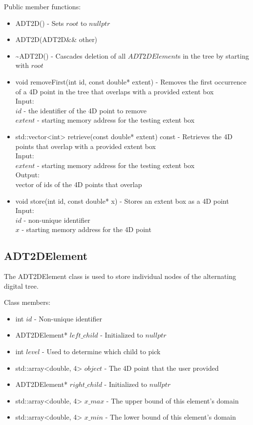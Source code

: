 \documentclass[manuscript, screen]{acmart}
\begin{document}
Public member functions:
\begin{itemize}
\item ADT2D() - Sets $root$ to $nullptr$

\item ADT2D(ADT2D\&\& other)

\item \textasciitilde{}ADT2D() - Cascades deletion of all $ADT2DElement$s in the tree by starting with $root$
%

\item void removeFirst(int id, const double* extent) - Removes the first occurrence of a 4D point in the tree that overlaps with a provided extent box\\
Input:\\
$id$ - the identifier of the 4D point to remove\\
$extent$ - starting memory address for the testing extent box

\item std::vector<int> retrieve(const double* extent) const - Retrieves the 4D points that overlap with a provided extent box\\
Input:\\
$extent$ - starting memory address for the testing extent box\\
Output:\\
vector of ids of the 4D points that overlap

\item void store(int id, const double* x) - Stores an extent box as a 4D point\\
Input:\\
$id$ - non-unique identifier\\
$x$ - starting memory address for the 4D point
\end{itemize}

\subsection{ADT2DElement}

The ADT2DElement class is used to store individual nodes of the alternating digital tree.

Class members:
\begin{itemize}
\item int $id$ - Non-unique identifier
\item ADT2DElement* $left\_child$ - Initialized to $nullptr$
\item int $level$ - Used to determine which child to pick
\item std::array<double, 4> $object$ - The 4D point that the user provided
\item ADT2DElement* $right\_child$ - Initialized to $nullptr$
\item std::array<double, 4> $x\_max$ - The upper bound of this element's domain
\item std::array<double, 4> $x\_min$ - The lower bound of this element's domain
\end{itemize}
\end{document}
